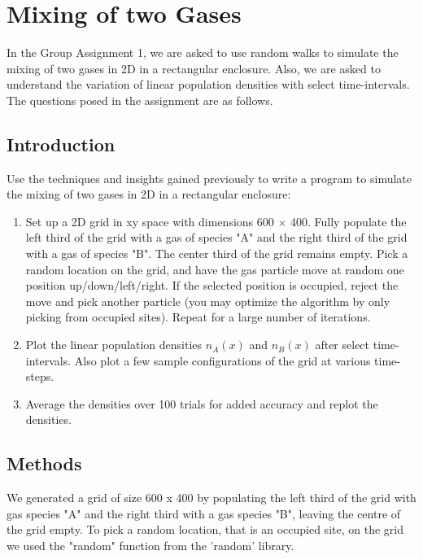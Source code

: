 \documentclass[11pt, oneside]{article}  	%
\begin{document}

\section{Mixing of two Gases}
In the Group Assignment 1, we are asked to use random walks to simulate the mixing of two gases in 2D in a rectangular enclosure. Also, we are asked to understand the variation of linear population densities with select time-intervals. The questions posed in the assignment are as follows.

\subsection{Introduction}
Use the techniques and insights gained previously to write a program to simulate the mixing of two gases in 2D in a rectangular enclosure:

\begin{enumerate}[label=(\alph*)]

\item Set up a 2D grid in xy space with dimensions 600 $\times$ 400. Fully populate the left third of the grid with a gas of species "A" and the right third of the grid with a gas of species "B". The center third of the grid remains empty. Pick a random location on the grid, and have the gas particle move at random one position up/down/left/right. If the selected position is occupied, reject the move and pick another particle (you may optimize the algorithm by only picking from occupied sites). Repeat for a large number of iterations. 

\item Plot the linear population densities $n_A (x)$ and $n_B (x)$ after select time-intervals. Also plot a few sample configurations of the grid at various time-steps.

\item Average the densities over 100 trials for added accuracy and replot the densities.

\end{enumerate}

\subsection{Methods}
We generated a grid of size 600 x 400 by populating the left third of the grid with gas species "A" and the right third with a gas species "B", leaving the centre of the grid empty. To pick a random location, that is an occupied site, on the grid we used the "random" function from the 'random' library. 
\end{document}
